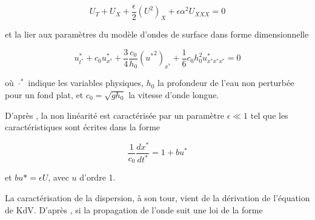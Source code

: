 \begin{equation}
\label{eq:scaledKdV}
U_T + U_X + \frac{\epsilon}{2} (U^2)_X + \epsilon\alpha^2U_{XXX} = 0
\end{equation}

\noindent et la lier aux paramètres du modèle d'ondes de surface dans forme dimensionnelle \cite{Khorsand2014}

\begin{equation}
\label{eq:physiqueKdV}
    u^*_{t^*} + c_0u^*_{x^*} + \frac{3}{4}\frac{c_0}{h_0}({u^*}^2)_{x^*} + \frac{1}{6}c_0h_0^2u^*_{x^*x^*x^*} = 0 
\end{equation}

\noindent où $\cdot^*$ indique les variables physiques, $h_0$ la profondeur de l'eau non perturbée pour un fond plat, et $c_0 = \sqrt{gh_0}$ la vitesse d'onde longue.

%
%
%
%
%
%
%
%


\indent D'après \cite{BBM1971}, la non linéarité est caractérisée par un paramètre $\epsilon \ll 1$ tel que les caractéristiques sont écrites dans la forme

$$ \frac{1}{c_0} \frac{dx^*}{dt^*} = 1+ bu^*$$

\noindent et $bu*=\epsilon U$, avec $u$ d'ordre 1. 


\indent La caractérisation de la dispersion, à son tour, vient de la dérivation de l'équation de KdV. D'après \cite{BBM1971}, si la propagation de l'onde suit une loi de la forme

